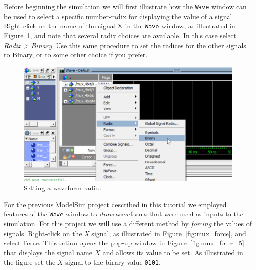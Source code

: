 \documentclass[11pt, twoside, pdftex]{article}
\begin{document}
Before beginning the simulation we will first illustrate how the \texttt{Wave} window
can be used to select a specific number-radix for displaying the value of a signal. 
Right-click on the name of the signal {\sf X} in the \texttt{Wave} window, as illustrated 
in Figure~\ref{fig:mux_radix}, and note that several radix choices are available. In this 
case select {\it Radix > Binary}. Use this same procedure to set the radices for the other
signals to {\sf Binary}, or to some other choice if you prefer.

\begin{figure}[H]
   \begin{center}
      \includegraphics[scale=.75]{figures/mux_radix.png}
   \caption{Setting a waveform radix.} 
	 \label{fig:mux_radix}
	 \end{center}
\end{figure}

For the previous ModelSim project described in this tutorial we employed features of the 
\texttt{Wave} window to {\it draw} waveforms that were used as inputs to the simulation. 
For this project we will use a different method by {\it forcing} the values of signals. 
Right-click on the {\it X} signal, as illustrated in Figure~\ref{fig:mux_force}, and 
select {\sf Force}. This action opens the pop-up window in Figure~\ref{fig:mux_force_5} that 
displays the signal name $X$ and allows its value to be set.  As illustrated in
the figure set the $X$ signal to the binary value \texttt{0101}.
\end{document}
